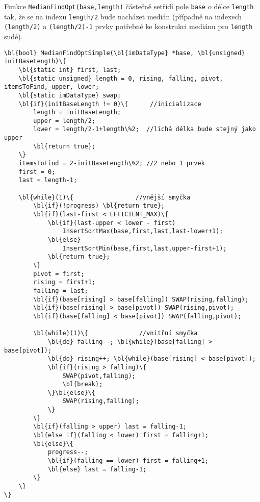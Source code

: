         Funkce {\tt MedianFindOpt(base,length)} částečně setřídí pole {\tt base} o délce {\tt length} tak, že se na indexu {\tt length/2} bude nacházet medián (případně na indexech {\tt (length/2)} a {\tt (length/2)-1} prvky potřebné ke konstrukci mediánu pro {\tt length} sudé).

        \begin{Verbatim}[commandchars = \\\{\}]
\bl{bool} MedianFindOptSimple(\bl{imDataType} *base, \bl{unsigned} initBaseLength)\{
    \bl{static int} first, last;
    \bl{static unsigned} length = 0, rising, falling, pivot, itemsToFind, upper, lower;
    \bl{static imDataType} swap;
    \bl{if}(initBaseLength != 0)\{      //inicializace
        length = initBaseLength;
        upper = length/2;
        lower = length/2-1+length\%2;  //lichá délka bude stejný jako upper
        \bl{return true};
    \}
    itemsToFind = 2-initBaseLength\%2; //2 nebo 1 prvek
    first = 0;	
    last = length-1;

    \bl{while}(1)\{                 //vnější smyčka
        \bl{if}(!progress) \bl{return true};
        \bl{if}(last-first < EFFICIENT_MAX)\{
            \bl{if}(last-upper < lower - first)
                InsertSortMax(base,first,last,last-lower+1);	
            \bl{else}
                InsertSortMin(base,first,last,upper-first+1);	
            \bl{return true};
        \}
        pivot = first;
        rising = first+1;
        falling = last;
        \bl{if}(base[rising] > base[falling]) SWAP(rising,falling);
        \bl{if}(base[rising] > base[pivot]) SWAP(rising,pivot);
        \bl{if}(base[falling] < base[pivot]) SWAP(falling,pivot);

        \bl{while}(1)\{			     //vnitřní smyčka				
            \bl{do} falling--; \bl{while}(base[falling] > base[pivot]);
            \bl{do} rising++; \bl{while}(base[rising] < base[pivot]);
            \bl{if}(rising > falling)\{	
                SWAP(pivot,falling);
                \bl{break};
            \}\bl{else}\{					
                SWAP(rising,falling);
            \}
        \}
        \bl{if}(falling > upper) last = falling-1;	
        \bl{else if}(falling < lower) first = falling+1;
        \bl{else}\{
            progress--;
            \bl{if}(falling == lower) first = falling+1;
            \bl{else} last = falling-1;
        \}
    \}
\}
        \end{Verbatim}

